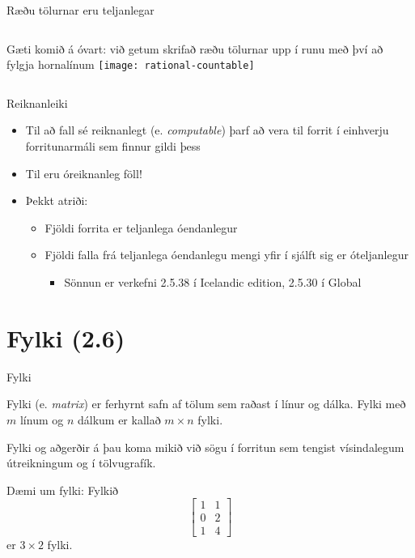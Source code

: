 \documentclass[handout]{beamer}
\begin{document}
\begin{frame}{Ræðu tölurnar eru teljanlegar}
    \begin{columns}
        Gæti komið á óvart: við getum skrifað ræðu tölurnar upp í runu með því að fylgja hornalínum
        \texttt{[image: rational-countable]}
    \end{columns}
\end{frame}

\begin{frame}{Reiknanleiki}
\begin{itemize}
 \item Til að fall sé reiknanlegt (e. \emph{computable}) þarf að vera til forrit í einhverju forritunarmáli sem finnur gildi þess
 \item Til eru óreiknanleg föll!
 \item Þekkt atriði:
 \begin{itemize}
  \item Fjöldi forrita er teljanlega óendanlegur \pause
  \item Fjöldi falla frá teljanlega óendanlegu mengi yfir í sjálft sig er óteljanlegur
  \begin{itemize}
      \item Sönnun er verkefni 2.5.38 í Icelandic edition, 2.5.30 í Global
  \end{itemize}
 \end{itemize}
\end{itemize}
\end{frame}

\section{Fylki (2.6)}

\begin{frame}{Fylki}
\begin{tcolorbox}[title=Fylki]
Fylki (e. \emph{matrix}) er ferhyrnt safn af tölum sem raðast í línur og dálka. Fylki með $m$ línum og $n$ dálkum er kallað $m \times n$ fylki.
\end{tcolorbox}
Fylki og aðgerðir á þau koma mikið við sögu í forritun sem tengist vísindalegum útreikningum og í tölvugrafík.

Dæmi um fylki: Fylkið
\[
\begin{bmatrix}
1&1\\0&2\\1&4
\end{bmatrix}
\]
er $3 \times 2$ fylki.
\end{frame}
\end{document}
